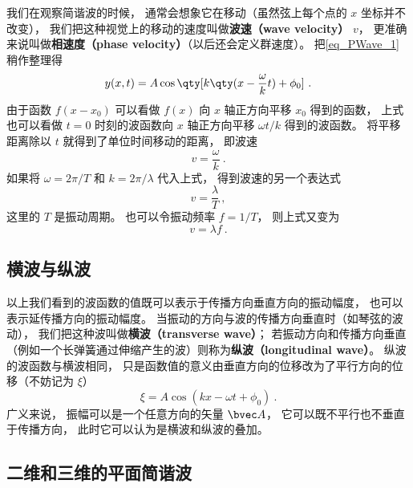 我们在观察简谐波的时候， 通常会想象它在移动（虽然弦上每个点的 $x$ 坐标并不改变）， 我们把这种视觉上的移动的速度叫做\textbf{波速（wave velocity）} $v$， 更准确来说叫做\textbf{相速度（phase velocity）}（以后还会定义群速度）。 把\autoref{eq_PWave_1} 稍作整理得
\begin{equation}
y(x, t) = A\cos \qty[k \qty(x - \frac{\omega}{k} t) + \phi_0]~.
\end{equation}
由于函数 $f(x - x_0)$ 可以看做 $f(x)$ 向 $x$ 轴正方向平移 $x_0$ 得到的函数， 上式也可以看做 $t = 0$ 时刻的波函数向 $x$ 轴正方向平移 $\omega t/k$ 得到的波函数。 将平移距离除以 $t$ 就得到了单位时间移动的距离， 即波速
\begin{equation}
v = \frac{\omega}{k}~.
\end{equation}
如果将 $\omega = 2\pi/T$ 和 $k = 2\pi/\lambda$ 代入上式， 得到波速的另一个表达式
\begin{equation}
v = \frac{\lambda}{T}~,
\end{equation}
这里的 $T$ 是振动周期。 也可以令振动频率 $f = 1/T$， 则上式又变为
\begin{equation}
v = \lambda f~.
\end{equation}

\subsection{横波与纵波}\label{sub_PWave_1}
以上我们看到的波函数的值既可以表示于传播方向垂直方向的振动幅度， 也可以表示延传播方向的振动幅度。 当振动的方向与波的传播方向垂直时（如琴弦的波动）， 我们把这种波叫做\textbf{横波（transverse wave）}； 若振动方向和传播方向垂直（例如一个长弹簧通过伸缩产生的波）则称为\textbf{纵波（longitudinal wave）}。 纵波的波函数与横波相同， 只是函数值的意义由垂直方向的位移改为了平行方向的位移（不妨记为 $\xi$）
\begin{equation}
\xi = A \cos(k x - \omega t + \phi_0)~.
\end{equation}
广义来说， 振幅可以是一个任意方向的矢量 $\bvec A$， 它可以既不平行也不垂直于传播方向， 此时它可以认为是横波和纵波的叠加。

\subsection{二维和三维的平面简谐波}

